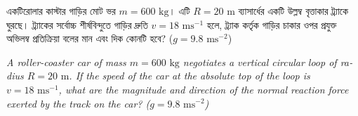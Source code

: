 \documentclass[12pt, a4paper]{article}
\begin{document}
\begin{tcolorbox}[questionbox={প্রশ্ন (Question) 50}]
\noindent
একটিরোলার কাস্টার গাড়ির মোট ভর $m = 600\text{ kg}$। এটি $R = 20\text{ m}$ ব্যাসার্ধের একটি উল্লম্ব বৃত্তাকার ট্র্যাকে ঘুরছে। ট্র্যাকের সর্বোচ্চ শীর্ষবিন্দুতে গাড়ির দ্রুতি $v = 18\text{ ms}^{-1}$ হলে, ট্র্যাক কর্তৃক গাড়ির চাকার ওপর প্রযুক্ত অভিলম্ব প্রতিক্রিয়া বলের মান এবং দিক কোনটি হবে? ($g = 9.8\text{ ms}^{-2}$)

\vspace{0.8em}
\begin{english}
\noindent\textit{\color{darkgray}
A roller-coaster car of mass $m = 600\text{ kg}$ negotiates a vertical circular loop of radius $R = 20\text{ m}$. If the speed of the car at the absolute top of the loop is $v = 18\text{ ms}^{-1}$, what are the magnitude and direction of the normal reaction force exerted by the track on the car? ($g = 9.8\text{ ms}^{-2}$)
}
\end{english}
\end{tcolorbox}
\end{document}
